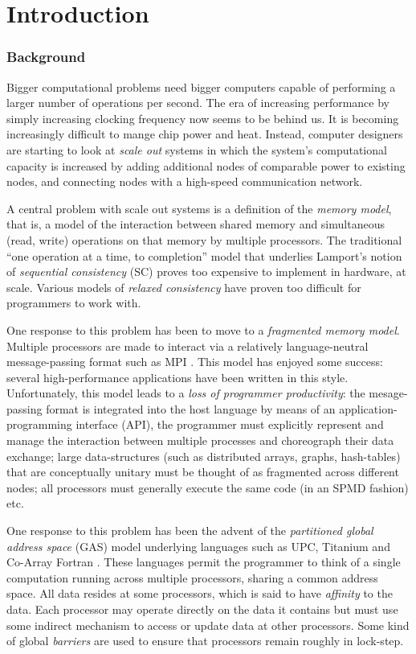 \chapter{Introduction}
\subsection*{Background}
Bigger computational problems need bigger computers capable of
performing a larger number of operations per second. The era of
increasing performance by simply increasing clocking frequency now
seems to be behind us. It is becoming increasingly difficult
to mange chip power and heat.  Instead, computer
designers are starting to look at {\em scale out} systems in which the
system's computational capacity is increased by adding additional
nodes of comparable power to existing nodes, and connecting nodes with
a high-speed communication network.

A central problem with scale out systems is a definition of the {\em
memory model}, that is, a model of the interaction between shared
memory and  simultaneous (read, write) operations on that
memory by multiple processors. The traditional ``one operation at a
time, to completion'' model that underlies Lamport's notion of {\em
sequential consistency} (SC) proves too expensive to implement in
hardware, at scale. Various models of {\em relaxed consistency} have
proven too difficult for programmers to work with.  

One response to this problem has been to move to a {\em fragmented
memory model}. Multiple processors are made to interact via a
relatively language-neutral message-passing format such as MPI
\cite{mpi}. This model has enjoyed some success: several
high-performance applications have been written in this
style. Unfortunately, this model leads to a {\em loss of programmer
productivity}: the mesage-passing format is integrated into the host
language by means of an application-programming interface (API), the
programmer must explicitly represent and manage the interaction
between multiple processes and choreograph their data exchange; large
data-structures (such as distributed arrays, graphs, hash-tables) that
are conceptually unitary must be thought of as fragmented across
different nodes; all processors must generally execute the same code
(in an SPMD fashion) etc.

One response to this problem has been the advent of the {\em
partitioned global address space} (GAS) model underlying languages
such as UPC, Titanium and Co-Array Fortran \cite{pgas,titanium}. These
languages permit the programmer to think of a single computation
running across multiple processors, sharing a common address
space. All data resides at some processors, which is said to have {\em
affinity} to the data.  Each processor may operate directly on the
data it contains but must use some indirect mechanism to access or
update data at other processors. Some kind of global {\em barriers}
are used to ensure that processors remain roughly in lock-step.

